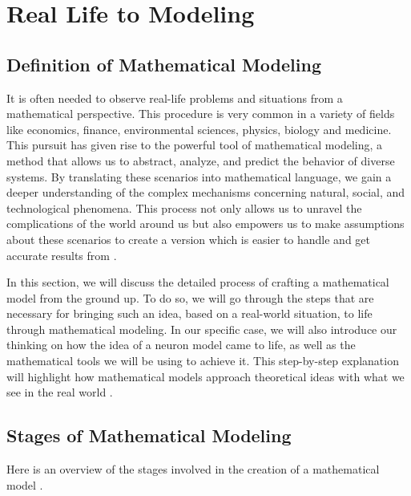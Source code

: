 \documentclass[class={myRUCProject}, crop=false]{standalone}
\begin{document}
\section{Real Life to Modeling}

\subsection{Definition of Mathematical Modeling}

It is often needed to observe real-life problems and situations from a mathematical perspective. This procedure is very common in a variety of fields like economics, finance, environmental sciences, physics, biology and medicine. This pursuit has given rise to the powerful tool of mathematical modeling, a method that allows us to abstract, analyze, and predict the behavior of diverse systems. By translating these scenarios into mathematical language, we gain a deeper understanding of the complex mechanisms concerning natural, social, and technological phenomena. This process not only allows us to unravel the complications of the world around us but also empowers us to make assumptions about these scenarios to create a version which is easier to handle and get accurate results from \cite{dym2004principles}.

In this section, we will discuss the detailed process of crafting a mathematical model from the ground up. To do so, we will go through the steps that are necessary for bringing such an idea, based on a real-world situation, to life through mathematical modeling. In our specific case, we will also introduce our thinking on how the idea of a neuron model came to life, as well as the mathematical tools we will be using to achieve it. This step-by-step explanation will highlight how mathematical models approach theoretical ideas with what we see in the real world \cite{dym2004principles}.

\subsection{Stages of Mathematical Modeling}

Here is an overview of the stages involved in the creation of a mathematical model \cite{dym2004principles}.
\end{document}
